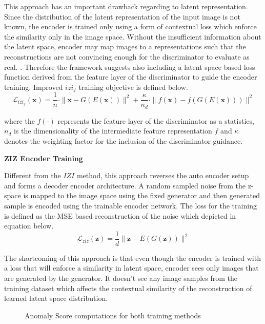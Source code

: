 This approach has an important drawback regarding to latent representation. Since the distribution
of the latent representation of the input image is not known, the encoder is trained only using a
form of contextual loss which enforce the similarity only in the image space. Without the
insufficient information about the latent space, encoder may map images to a representations such
that the reconstructions are not convincing enough for the discriminator to evaluate as real.
\cite{pub.1111824956}. Therefore the framework suggests also including a latent space based loss
function derived from the feature layer of the discriminator to guide the encoder training. Improved
$izi_{f}$ training objective is defined below.
\begin{equation}
	\mathcal{L}_{i z i_{f}}(\mathbf{x})=\frac{1}{n} \cdot\|\mathbf{x}-G(E(\mathbf{x}))\|^{2}+\frac{\kappa}{n_{d}} \cdot\|f(\mathbf{x})-f(G(E(\mathbf{x})))\|^{2}
\end{equation}

where the $f(\cdot)$ represents the feature layer of the discriminator as a statistics, $n_{d}$ is
the dimensionality of the intermediate feature representation $f$ and $\kappa$ denotes the weighting
factor for the inclusion of the discriminator guidance.

\textbf{ZIZ Encoder Training}

Different from the $IZI$ method, this approach reverses the auto encoder setup and forms a decoder
encoder architecture. A random sampled noise from the z-space is mapped to the image space using the
fixed generator and then generated sample is encoded using the trainable encoder network. The loss
for the training is defined as the MSE based reconstruction of the noise which depicted in equation
below. 
\begin{equation}
	\mathcal{L}_{z i z}(\mathbf{z})=\frac{1}{d}\|\mathbf{z}-E(G(\mathbf{z}))\|^{2}
\end{equation}

The shortcoming of this approach is that even though the encoder is trained with a loss that will
enforce a similarity in latent space, encoder sees only images that are generated by the generator.
It doesn't see any image samples from the training dataset which affects the contextual similarity
of the reconstruction of learned latent space distribution. 
\begin{figure}[h!] 
	\hfill 	
	\caption{Anomaly Score computations for both training methods \cite{pub.1111824956}}
	\label{fig:fanogan_anomaly_score}
\end{figure}

